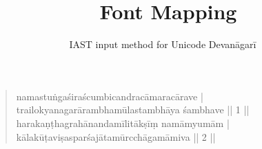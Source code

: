 \documentclass[a4paper,oneside,12pt]{article}
\title{\XeTeX\ Font Mapping}
\author{IAST input method for Unicode Devanāgarī}
\date{\relax}
\newcommand{\dn}[1]{\textsanskrit{\devanagarifont#1}}
\begin{document}
\maketitle
\thispagestyle{empty}
\bigskip

\begin{verse}
  \dn{
    namastuṅgaśiraścumbicandracāmaracārave |\\
    trailokyanagarārambhamūlastambhāya śambhave || 1 ||\\
    harakaṇṭhagrahānandamīlitākṣīṃ namāmyumām |\\
    kālakūṭaviṣasparśajātamūrcchāgamāmiva || 2 ||
  }
\end{verse}
\end{document}
